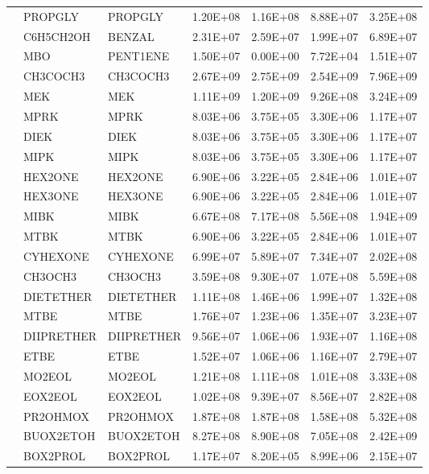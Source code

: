 \begin{longtable}{lllllll}
	 & PROPGLY & PROPGLY & 1.20E+08 & 1.16E+08 & 8.88E+07 & 3.25E+08 \\
	 & C6H5CH2OH & BENZAL & 2.31E+07 & 2.59E+07 & 1.99E+07 & 6.89E+07 \\
	 & MBO & PENT1ENE & 1.50E+07 & 0.00E+00 & 7.72E+04 & 1.51E+07 \\
	\hline \parbox[t]{2mm}{} & CH3COCH3 & CH3COCH3 & 2.67E+09 & 2.75E+09 & 2.54E+09 & 7.96E+09 \\
	 & MEK & MEK & 1.11E+09 & 1.20E+09 & 9.26E+08 & 3.24E+09 \\
	 & MPRK & MPRK & 8.03E+06 & 3.75E+05 & 3.30E+06 & 1.17E+07 \\
	 & DIEK & DIEK & 8.03E+06 & 3.75E+05 & 3.30E+06 & 1.17E+07 \\
	 & MIPK & MIPK & 8.03E+06 & 3.75E+05 & 3.30E+06 & 1.17E+07 \\
	 & HEX2ONE & HEX2ONE & 6.90E+06 & 3.22E+05 & 2.84E+06 & 1.01E+07 \\
	 & HEX3ONE & HEX3ONE & 6.90E+06 & 3.22E+05 & 2.84E+06 & 1.01E+07 \\
	 & MIBK & MIBK & 6.67E+08 & 7.17E+08 & 5.56E+08 & 1.94E+09 \\
	 & MTBK & MTBK & 6.90E+06 & 3.22E+05 & 2.84E+06 & 1.01E+07 \\
	 & CYHEXONE & CYHEXONE & 6.99E+07 & 5.89E+07 & 7.34E+07 & 2.02E+08 \\
	\hline \parbox[t]{2mm}{} & CH3OCH3 & CH3OCH3 & 3.59E+08 & 9.30E+07 & 1.07E+08 & 5.59E+08 \\*
	 & DIETETHER & DIETETHER & 1.11E+08 & 1.46E+06 & 1.99E+07 & 1.32E+08 \\*
	 & MTBE & MTBE & 1.76E+07 & 1.23E+06 & 1.35E+07 & 3.23E+07 \\
	 & DIIPRETHER & DIIPRETHER & 9.56E+07 & 1.06E+06 & 1.93E+07 & 1.16E+08 \\
	 & ETBE & ETBE & 1.52E+07 & 1.06E+06 & 1.16E+07 & 2.79E+07 \\
	 & MO2EOL & MO2EOL & 1.21E+08 & 1.11E+08 & 1.01E+08 & 3.33E+08 \\
	 & EOX2EOL & EOX2EOL & 1.02E+08 & 9.39E+07 & 8.56E+07 & 2.82E+08 \\
	 & PR2OHMOX & PR2OHMOX & 1.87E+08 & 1.87E+08 & 1.58E+08 & 5.32E+08 \\
	 & BUOX2ETOH & BUOX2ETOH & 8.27E+08 & 8.90E+08 & 7.05E+08 & 2.42E+09 \\
	 & BOX2PROL & BOX2PROL & 1.17E+07 & 8.20E+05 & 8.99E+06 & 2.15E+07 \\

\end{longtable}
